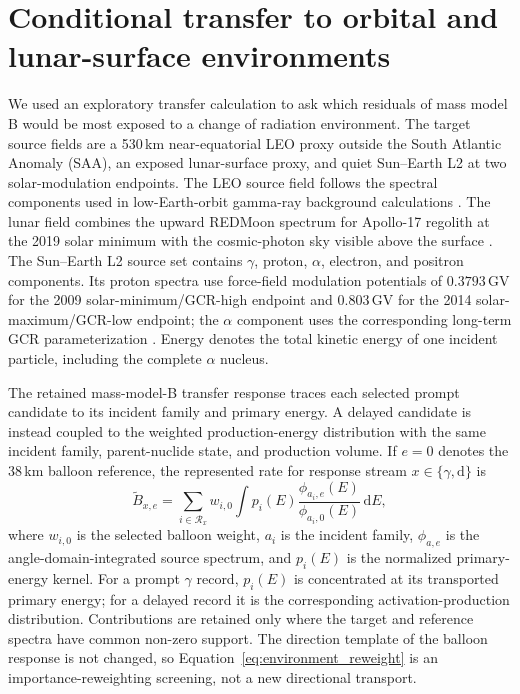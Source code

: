 \documentclass[11pt]{article}
\begin{document}
\FloatBarrier

\section{Conditional transfer to orbital and lunar-surface environments}
\label{sec:environment_screening}

We used an exploratory transfer calculation to ask which residuals of mass
model B would be most exposed to a change of radiation environment. The target
source fields are a 530\,km near-equatorial LEO proxy outside the South
Atlantic Anomaly (SAA), an exposed lunar-surface proxy, and quiet Sun--Earth L2
at two solar-modulation endpoints. The LEO source field follows the spectral
components used in low-Earth-orbit gamma-ray background calculations
\cite{Cumani2019LEO}. The lunar field combines the upward REDMoon spectrum for
Apollo-17 regolith at the 2019 solar minimum with the cosmic-photon sky visible
above the surface \cite{Dobynde2021REDMoon}. The Sun--Earth L2 source set
contains $\gamma$, proton, $\alpha$, electron, and positron components. Its
proton spectra use force-field modulation potentials of
$0.3793$\,GV for the 2009 solar-minimum/GCR-high endpoint and $0.803$\,GV for
the 2014 solar-maximum/GCR-low endpoint; the $\alpha$ component uses the
corresponding long-term GCR parameterization
\cite{Lotti2021Athena,Usoskin2005,Kuznetsov2017}. Energy denotes the total
kinetic energy of one incident particle, including the complete $\alpha$
nucleus.

The retained mass-model-B transfer response traces each selected prompt candidate to
its incident family and primary energy. A delayed candidate is instead coupled
to the weighted production-energy distribution with the same incident family,
parent-nuclide state, and production volume. If $e=0$ denotes the 38\,km
balloon reference, the represented rate for response stream
$x\in\{\gamma,\mathrm d\}$ is
\begin{equation}
 \widetilde B_{x,e}=
 \sum_{i\in\mathcal R_x}w_{i,0}
 \int p_i(E)
 \frac{\phi_{a_i,e}(E)}{\phi_{a_i,0}(E)}
 \,\mathrm dE ,
 \label{eq:environment_reweight}
\end{equation}
where $w_{i,0}$ is the selected balloon weight, $a_i$ is the incident family,
$\phi_{a,e}$ is the angle-domain-integrated source spectrum, and $p_i(E)$ is
the normalized primary-energy kernel. For a prompt $\gamma$ record, $p_i(E)$
is concentrated at its transported primary energy; for a delayed record it is
the corresponding activation-production distribution. Contributions are
retained only where the target and reference spectra have common non-zero
support. The direction template of the balloon response is not changed, so
Equation~\eqref{eq:environment_reweight} is an importance-reweighting
screening, not a new directional transport.
\end{document}
